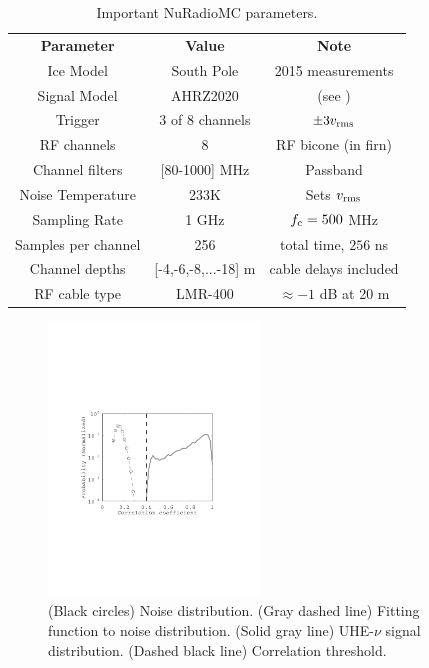 \documentclass[amsmath,amssymb,aps,prd,10pt,twocolumn,showkeys]{revtex4}
\begin{document}
\begin{table}
\small
\centering
\begin{tabular}{| c | c | c |}
\hline
\textbf{Parameter} & \textbf{Value} & \textbf{Note} \\
Ice Model & South Pole & 2015 measurements \\
Signal Model & AHRZ2020 & (see \cite{PhysRevD.101.083005}) \\
Trigger & 3 of 8 channels & $\pm 3v_{\rm rms}$ \\
RF channels & 8 & RF bicone (in firn) \\
Channel filters & [80-1000] MHz & Passband \\
Noise Temperature & 233K & Sets $v_{\rm rms}$ \\
Sampling Rate & 1 GHz & $f_{\rm c} = 500$ MHz \\
Samples per channel & 256 & total time, $256$ ns \\
Channel depths & [-4,-6,-8,...-18] m & cable delays included \\
RF cable type & LMR-400 & $\approx -1$ dB at 20 m  \\
\hline
\end{tabular}
\caption{\label{tab:1} Important NuRadioMC parameters.}
\end{table}

\begin{figure}
\centering
\includegraphics[width=0.5\textwidth,trim=3.25cm 8.25cm 4.5cm 9.0cm,clip=true]{Aug15_plot1.pdf}
\caption{\label{fig:fig3} (Black circles) Noise distribution. (Gray dashed line) Fitting function to noise distribution.  (Solid gray line) UHE-$\nu$ signal distribution.  (Dashed black line) Correlation threshold.}
\end{figure}
\end{document}

